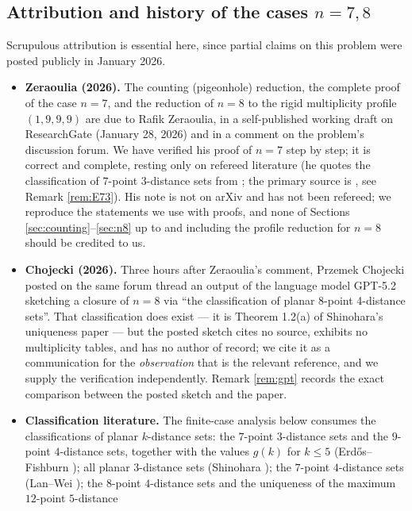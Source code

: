 \documentclass[11pt]{article}
\theoremstyle{definition}
\theoremstyle{remark}
\begin{document}
\subsection*{Attribution and history of the cases $n = 7, 8$}

Scrupulous attribution is essential here, since partial claims on this problem were posted
publicly in January 2026.

\begin{itemize}
\item \textbf{Zeraoulia (2026).} The counting (pigeonhole) reduction, the complete proof
of the case $n = 7$, and the reduction of $n = 8$ to the rigid multiplicity profile
$(1,9,9,9)$ are due to Rafik Zeraoulia, in a self-published working draft on ResearchGate
\cite{Zeraoulia26} (January 28, 2026) and in a comment on the problem's discussion forum.
We have verified his proof of $n = 7$ step by step; it is correct and complete, resting
only on refereed literature (he quotes the classification of $7$-point $3$-distance sets
from \cite[\S 1]{Wei12}; the primary source is \cite[Theorem~1]{ErFi96}, see Remark
\ref{rem:E73}). His note is not on arXiv and has not been refereed; we reproduce the
statements we use with proofs, and none of Sections
\ref{sec:counting}--\ref{sec:n8} up to and including the profile reduction for $n=8$
should be credited to us.
\item \textbf{Chojecki (2026).} Three hours after Zeraoulia's comment, Przemek Chojecki
posted on the same forum thread \cite{Chojecki26} an output of the language model GPT-5.2
sketching a closure of $n = 8$ via ``the classification of planar 8-point 4-distance
sets''. That classification does exist --- it is Theorem 1.2(a) of Shinohara's
uniqueness paper \cite{Shinohara08} --- but the posted sketch cites no source, exhibits no
multiplicity tables, and has no author of record; we cite it as a communication for the
\emph{observation} that \cite{Shinohara08} is the relevant reference, and we supply the
verification independently. Remark \ref{rem:gpt} records the exact comparison between
the posted sketch and the paper.
\item \textbf{Classification literature.} The finite-case analysis below consumes the
classifications of planar $k$-distance sets: the $7$-point $3$-distance sets and the
$9$-point $4$-distance sets, together with the values $g(k)$ for $k \le 5$
(Erd\H{o}s--Fishburn \cite{ErFi96}); all planar $3$-distance sets (Shinohara
\cite{Shinohara04}); the $7$-point $4$-distance sets (Lan--Wei \cite{LanWei13}); the
$8$-point $4$-distance sets and the uniqueness of the maximum $12$-point $5$-distance

\end{itemize}
\end{document}

